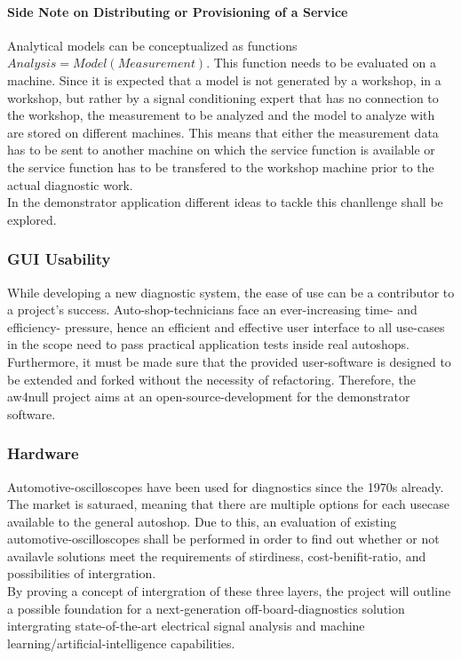 \paragraph{Side Note on Distributing or Provisioning of a Service}
Analytical models can be conceptualized as functions $Analysis = Model(Measurement)$.
This function needs to be evaluated on a machine.
Since it is expected that a model is not generated by a workshop, in a workshop, but rather by a signal conditioning expert that has no connection to the workshop, the measurement to be analyzed and the model to analyze with are stored on different machines.
This means that either the measurement data has to be sent to another machine on which the service function is available or the service function has to be transfered to the workshop machine prior to the actual diagnostic work. \hfill \\
In the demonstrator application different ideas to tackle this chanllenge shall be explored. 

\subsubsection{GUI Usability}
While developing a new diagnostic system, the ease of use can be a contributor to a project's success.
Auto-shop-technicians face an ever-increasing time- and efficiency- pressure, hence an efficient and effective user interface to all use-cases in the scope need to pass practical application tests inside real autoshops.
Furthermore, it must be made sure that the provided user-software is designed to be extended and forked without the necessity of refactoring.
Therefore, the aw4null project aims at an open-source-development for the demonstrator software.

\subsubsection{Hardware}
Automotive-oscilloscopes have been used for diagnostics since the 1970s already.
The market is saturaed, meaning that there are multiple options for each usecase available to the general autoshop.
Due to this, an evaluation of existing automotive-oscilloscopes shall be performed in order to find out whether or not availavle solutions meet the requirements of stirdiness, cost-benifit-ratio, and possibilities of intergration. \\

By proving a concept of intergration of these three layers, the project will outline a possible foundation for a next-generation off-board-diagnostics solution intergrating state-of-the-art electrical signal analysis and machine learning/artificial-intelligence capabilities.


